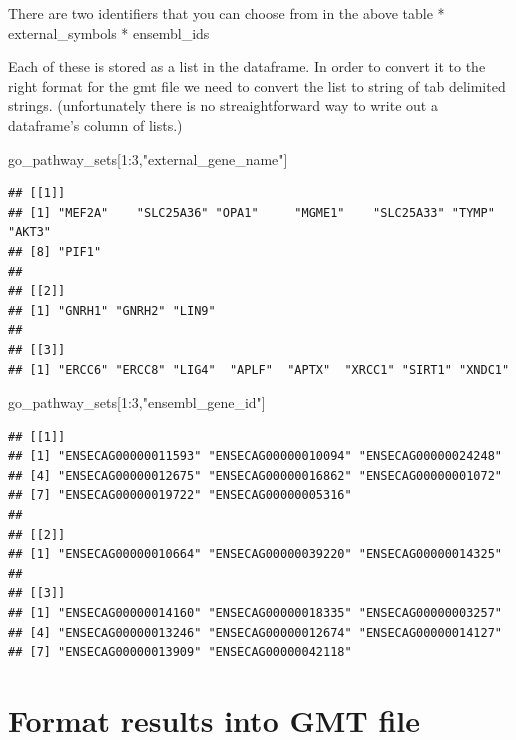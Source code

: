 \documentclass[
]{book}
\newenvironment{Shaded}{\begin{snugshade}}{\end{snugshade}}
\newcommand{\DecValTok}[1]{\textcolor[rgb]{0.00,0.00,0.81}{#1}}
\newcommand{\NormalTok}[1]{#1}
\newcommand{\SpecialCharTok}[1]{\textcolor[rgb]{0.00,0.00,0.00}{#1}}
\newcommand{\StringTok}[1]{\textcolor[rgb]{0.31,0.60,0.02}{#1}}
\begin{document}
There are two identifiers that you can choose from in the above table
* external\_symbols
* ensembl\_ids

Each of these is stored as a list in the dataframe. In order to convert it to the right format for the gmt file we need to convert the list to string of tab delimited strings. (unfortunately there is no streaightforward way to write out a dataframe's column of lists.)

\begin{Shaded}
\begin{Highlighting}[]
\NormalTok{go\_pathway\_sets[}\DecValTok{1}\SpecialCharTok{:}\DecValTok{3}\NormalTok{,}\StringTok{"external\_gene\_name"}\NormalTok{]}
\end{Highlighting}
\end{Shaded}

\begin{verbatim}
## [[1]]
## [1] "MEF2A"    "SLC25A36" "OPA1"     "MGME1"    "SLC25A33" "TYMP"     "AKT3"    
## [8] "PIF1"    
## 
## [[2]]
## [1] "GNRH1" "GNRH2" "LIN9" 
## 
## [[3]]
## [1] "ERCC6" "ERCC8" "LIG4"  "APLF"  "APTX"  "XRCC1" "SIRT1" "XNDC1"
\end{verbatim}

\begin{Shaded}
\begin{Highlighting}[]
\NormalTok{go\_pathway\_sets[}\DecValTok{1}\SpecialCharTok{:}\DecValTok{3}\NormalTok{,}\StringTok{"ensembl\_gene\_id"}\NormalTok{]}
\end{Highlighting}
\end{Shaded}

\begin{verbatim}
## [[1]]
## [1] "ENSECAG00000011593" "ENSECAG00000010094" "ENSECAG00000024248"
## [4] "ENSECAG00000012675" "ENSECAG00000016862" "ENSECAG00000001072"
## [7] "ENSECAG00000019722" "ENSECAG00000005316"
## 
## [[2]]
## [1] "ENSECAG00000010664" "ENSECAG00000039220" "ENSECAG00000014325"
## 
## [[3]]
## [1] "ENSECAG00000014160" "ENSECAG00000018335" "ENSECAG00000003257"
## [4] "ENSECAG00000013246" "ENSECAG00000012674" "ENSECAG00000014127"
## [7] "ENSECAG00000013909" "ENSECAG00000042118"
\end{verbatim}

\hypertarget{format-results-into-gmt-file}{%
\section{Format results into GMT file}\label{format-results-into-gmt-file}}
\end{document}
